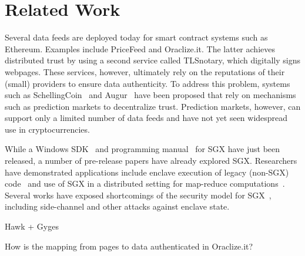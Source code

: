 \section{Related Work}
\label{sec:related}
Several data feeds are deployed today for smart contract systems such as Ethereum. Examples include PriceFeed and Oraclize.it. The latter achieves distributed trust by using a second service called TLSnotary, which digitally signs webpages. These services, however, ultimately rely on the reputations of their (small) providers to ensure data authenticity.  To address this problem, systems such as SchellingCoin~\cite{schellingcoin} and Augur~\cite{augur} have been proposed that rely on mechanisms such as prediction markets to decentralize trust. Prediction markets, however, can support only a limited number of data feeds and have not yet seen widespread use in cryptocurrencies. 

While a Windows SDK~\cite{sgxsdk} and programming manual~\cite{sgxmanual} for SGX have just been released, a number of pre-release papers have already explored SGX. Researchers have demonstrated applications include enclave execution of legacy (non-SGX) code~\cite{haven} and use of SGX in a distributed setting for map-reduce computations~\cite{vc3}. Several works have exposed shortcomings of the security model for SGX~\cite{sgxexplained,sgxsok,shihardwaretalk}, including side-channel and other attacks against enclave state. 

Hawk + Gyges

How is the mapping from pages to data authenticated in Oraclize.it?
